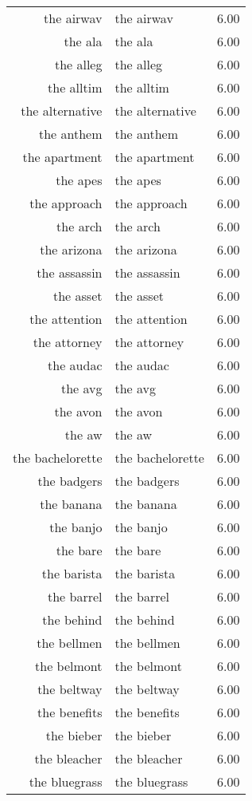 \begin{table}[ht]
\begin{tabular}{rlr}
  the airwav & the airwav & 6.00 \\ 
  the ala & the ala & 6.00 \\ 
  the alleg & the alleg & 6.00 \\ 
  the alltim & the alltim & 6.00 \\ 
  the alternative & the alternative & 6.00 \\ 
  the anthem & the anthem & 6.00 \\ 
  the apartment & the apartment & 6.00 \\ 
  the apes & the apes & 6.00 \\ 
  the approach & the approach & 6.00 \\ 
  the arch & the arch & 6.00 \\ 
  the arizona & the arizona & 6.00 \\ 
  the assassin & the assassin & 6.00 \\ 
  the asset & the asset & 6.00 \\ 
  the attention & the attention & 6.00 \\ 
  the attorney & the attorney & 6.00 \\ 
  the audac & the audac & 6.00 \\ 
  the avg & the avg & 6.00 \\ 
  the avon & the avon & 6.00 \\ 
  the aw & the aw & 6.00 \\ 
  the bachelorette & the bachelorette & 6.00 \\ 
  the badgers & the badgers & 6.00 \\ 
  the banana & the banana & 6.00 \\ 
  the banjo & the banjo & 6.00 \\ 
  the bare & the bare & 6.00 \\ 
  the barista & the barista & 6.00 \\ 
  the barrel & the barrel & 6.00 \\ 
  the behind & the behind & 6.00 \\ 
  the bellmen & the bellmen & 6.00 \\ 
  the belmont & the belmont & 6.00 \\ 
  the beltway & the beltway & 6.00 \\ 
  the benefits & the benefits & 6.00 \\ 
  the bieber & the bieber & 6.00 \\ 
  the bleacher & the bleacher & 6.00 \\ 
  the bluegrass & the bluegrass & 6.00 \\ 

\end{tabular}
\end{table}
